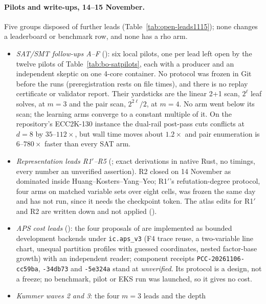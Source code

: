 \paragraph{Pilots and write-ups, 14--15 November.} Five groups disposed of
further leads (Table~\ref{tab:open-leads1115}); none changes a leaderboard
or benchmark row, and none has a rho arm.
\begin{itemize}
\item \emph{SAT/SMT follow-ups A--F} ():
  six local pilots, one per lead left open by the twelve pilots of
  Table~\ref{tab:bo-satpilots}, each with a producer and an independent
  skeptic on one 4-core container. No protocol was frozen in Git before
  the runs (preregistration rests on file times), and there is no replay
  certificate or validator report. Their yardsticks are the linear 2+1
  scan, $2^\ell$ leaf solves, at $m=3$ and the pair scan, $2^{2\ell}/2$,
  at $m=4$. No arm went below its scan; the learning arms converge to a
  constant multiple of it. On the repository's ECC2K-130 instance the
  dual-rail post-pass cuts conflicts at $d=8$ by $35$--$112\times$, but
  wall time moves about $1.2\times$ and pair enumeration is $6$--$780\times$
  faster than every SAT arm.
\item \emph{Representation leads R1$'$--R5}
  (; exact
  derivations in native Rust, no timings, every number an unverified
  assertion). R2 closed on 14 November as dominated inside
  Huang--Kosters--Yang--Yeo; R1$'$'s refutation-degree protocol, four arms
  on matched variable sets over eight cells, was frozen the same day and
  has not run, since it needs the checkpoint token. The atlas edits for
  R1$'$ and R2 are written down and not applied
  ().
\item \emph{APS cost leads} ():
  the four proposals of  are
  implemented as bounded development backends under \texttt{ic.aps\_v3}
  (F4 trace reuse, a two-variable line chart, unequal partition profiles
  with guessed coordinates, nested factor-base growth) with an independent
  reader; component receipts \texttt{PCC-20261106-cc59ba},
  \texttt{-34db73} and \texttt{-5e324a} stand at \emph{unverified}. Its
  protocol is a design, not a freeze; no benchmark, pilot or EKS run was
  launched, so it gives no cost.
\item \emph{Kummer waves 2 and 3}: the four $m=3$ leads and the depth

\end{itemize}
